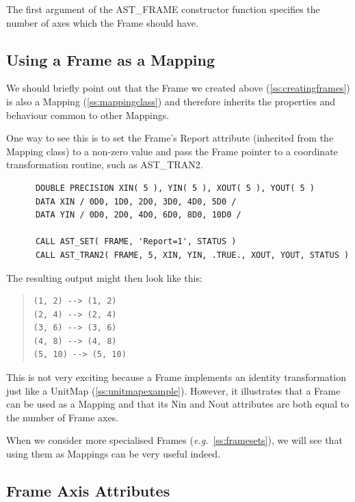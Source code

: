 \documentclass[twoside,11pt]{article}
\newcommand{\htmlref}[2]{#1}
\newcommand{\secref}[1]{\S\ref{#1}}
\renewcommand{\secref}[1]{\ref{#1}}
\begin{document}
The first argument of the \htmlref{AST\_FRAME}{AST_FRAME} constructor function specifies
the number of axes which the Frame should have.

\subsection{\label{ss:frameasmapping}Using a Frame as a Mapping}

We should briefly point out that the \htmlref{Frame}{Frame} we created above
(\secref{ss:creatingframes}) is also a \htmlref{Mapping}{Mapping}
(\secref{ss:mappingclass}) and therefore inherits the properties and
behaviour common to other Mappings.

One way to see this is to set the Frame's \htmlref{Report}{Report} attribute (inherited
from the Mapping class) to a non-zero value and pass the Frame pointer
to a coordinate transformation routine, such as \htmlref{AST\_TRAN2}{AST_TRAN2}.

\small
\begin{verbatim}
      DOUBLE PRECISION XIN( 5 ), YIN( 5 ), XOUT( 5 ), YOUT( 5 )
      DATA XIN / 0D0, 1D0, 2D0, 3D0, 4D0, 5D0 /
      DATA YIN / 0D0, 2D0, 4D0, 6D0, 8D0, 10D0 /

      CALL AST_SET( FRAME, 'Report=1', STATUS )
      CALL AST_TRAN2( FRAME, 5, XIN, YIN, .TRUE., XOUT, YOUT, STATUS )
\end{verbatim}
\normalsize

The resulting output might then look like this:

\begin{quote}
\begin{verbatim}
(1, 2) --> (1, 2)
(2, 4) --> (2, 4)
(3, 6) --> (3, 6)
(4, 8) --> (4, 8)
(5, 10) --> (5, 10)
\end{verbatim}
\end{quote}

This is not very exciting because a Frame implements an identity
transformation just like a \htmlref{UnitMap}{UnitMap}
(\secref{ss:unitmapexample}). However, it illustrates that a Frame can
be used as a Mapping and that its \htmlref{Nin}{Nin} and \htmlref{Nout}{Nout} attributes are both
equal to the number of Frame axes.

When we consider more specialised Frames
({\em{e.g.}}~\secref{ss:framesets}), we will see that using them as
Mappings can be very useful indeed.

\subsection{\label{ss:frameaxisattributes}Frame Axis Attributes}
\end{document}
